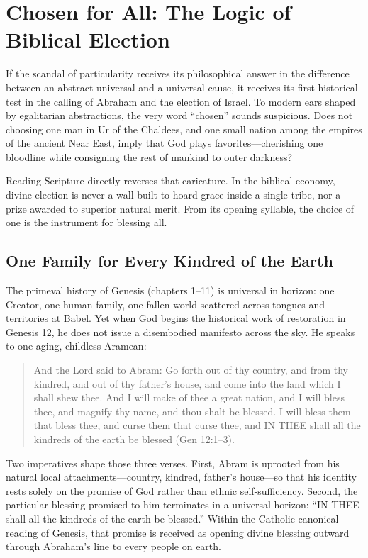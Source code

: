 \section{Chosen for All: The Logic of Biblical Election}

If the scandal of particularity receives its philosophical answer in the difference between an abstract universal and a universal cause, it receives its first historical test in the calling of Abraham and the election of Israel. To modern ears shaped by egalitarian abstractions, the very word ``chosen'' sounds suspicious. Does not choosing one man in Ur of the Chaldees, and one small nation among the empires of the ancient Near East, imply that God plays favorites---cherishing one bloodline while consigning the rest of mankind to outer darkness?

Reading Scripture directly reverses that caricature. In the biblical economy, divine election is never a wall built to hoard grace inside a single tribe, nor a prize awarded to superior natural merit. From its opening syllable, the choice of one is the instrument for blessing all.

\subsection{One Family for Every Kindred of the Earth}

The primeval history of Genesis (chapters 1--11) is universal in horizon: one Creator, one human family, one fallen world scattered across tongues and territories at Babel. Yet when God begins the historical work of restoration in Genesis 12, he does not issue a disembodied manifesto across the sky. He speaks to one aging, childless Aramean:

\begin{quote}
And the Lord said to Abram: Go forth out of thy country, and from thy kindred, and out of thy father's house, and come into the land which I shall shew thee. And I will make of thee a great nation, and I will bless thee, and magnify thy name, and thou shalt be blessed. I will bless them that bless thee, and curse them that curse thee, and IN THEE shall all the kindreds of the earth be blessed (Gen 12:1--3).
\end{quote}

Two imperatives shape those three verses. First, Abram is uprooted from his natural local attachments---country, kindred, father's house---so that his identity rests solely on the promise of God rather than ethnic self-sufficiency. Second, the particular blessing promised to him terminates in a universal horizon: ``IN THEE shall all the kindreds of the earth be blessed.'' Within the Catholic canonical reading of Genesis, that promise is received as opening divine blessing outward through Abraham's line to every people on earth.

